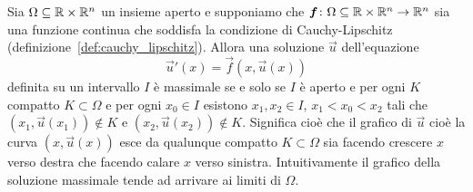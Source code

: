 \begin{proposition}
\label{prop:edo_massimale}
Sia $\Omega \subseteq {\mathbb R}\times {\mathbb R}^n$ un insieme aperto
e supponiamo che $\boldsymbol f\colon \Omega\subseteq {\mathbb R}\times{\mathbb R}^n\to{\mathbb R}^n$
sia una funzione continua che soddisfa la condizione
di Cauchy-Lipschitz (definizione~\ref{def:cauchy_lipschitz}).
Allora una soluzione $\vec u$ dell'equazione
\begin{equation}\label{eq:edo_normale_ordine_uno}
  \vec u'(x) = \vec f(x, \vec u(x))
\end{equation}
definita su un intervallo $I$ è massimale se e solo se
$I$ è aperto e per ogni $K$ compatto $K\subset \Omega$
e per ogni $x_0 \in I$ esistono $x_1,x_2\in I$, $x_1 < x_0 < x_2$ tali che 
$(x_1, \vec u(x_1))\not \in K$ e $(x_2,\vec u(x_2)) \not \in K$.
Significa cioè che il grafico di $\vec u$ cioè la curva $(x,\vec u(x))$ esce da qualunque compatto  
$K\subset \Omega$ sia facendo crescere $x$ verso destra che facendo calare $x$ verso sinistra.
Intuitivamente il grafico della soluzione massimale tende ad arrivare ai limiti di $\Omega$.
\end{proposition}
%
